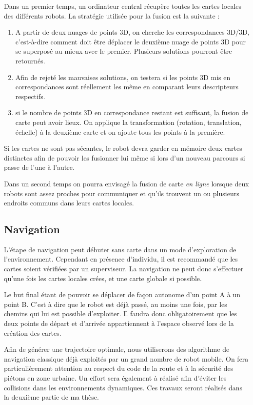 Dans un premier temps, un ordinateur central récupère toutes les cartes locales des différents robots.
La stratégie utilisée pour la fusion est la suivante :
\begin{enumerate}
\item A partir de deux nuages de points 3D, on cherche les correspondances 3D/3D, c'est-à-dire comment doit être déplacer le deuxième nuage de points 3D pour se superposé au mieux avec le premier.
Plusieurs solutions pourront être retournés.
\item Afin de rejeté les mauvaises solutions, on testera si les points 3D mis en correspondances sont réellement les même en comparant leurs descripteurs respectifs.
\item si le nombre de points 3D en correspondance restant est suffisant, la fusion de carte peut avoir lieux.
On applique la transformation (rotation, translation, échelle) à la deuxième carte et on ajoute tous les points à la première.
\end{enumerate}

Si les cartes ne sont pas sécantes, le robot devra garder en mémoire deux cartes distinctes afin de pouvoir les fusionner lui même si lors d'un nouveau parcours si passe de l'une à l'autre.

Dans un second temps on pourra envisagé la fusion de carte \emph{en ligne} lorsque deux robots sont assez proches pour communiquer et qu'ils trouvent un ou plusieurs endroits communs dans leurs cartes locales.

\subsection{Navigation}

L'étape de navigation peut débuter sans carte dans un mode d'exploration de l'environnement.
Cependant en présence d'individu, il est recommandé que les cartes soient vérifiées par un superviseur.
La navigation ne peut donc s'effectuer qu'une fois les cartes locales crées, et une carte globale si possible.

Le but final étant de pouvoir se déplacer de façon autonome d'un point A à un point B.
C'est à dire que le robot est déjà passé, au moins une fois, par les chemins qui lui est possible d'exploiter.
Il faudra donc obligatoirement que les deux points de départ et d'arrivée appartiennent à l'espace observé lors de la création des cartes.

Afin de générer une trajectoire optimale, nous utiliserons des algorithme de navigation classique déjà exploités par un grand nombre de robot mobile.
On fera particulièrement attention au respect du code de la route et à la sécurité des piétons en zone urbaine.
Un effort sera également à réalisé afin d'éviter les collisions dans les environnements dynamiques.
Ces travaux seront réalisés dans la deuxième partie de ma thèse. 

